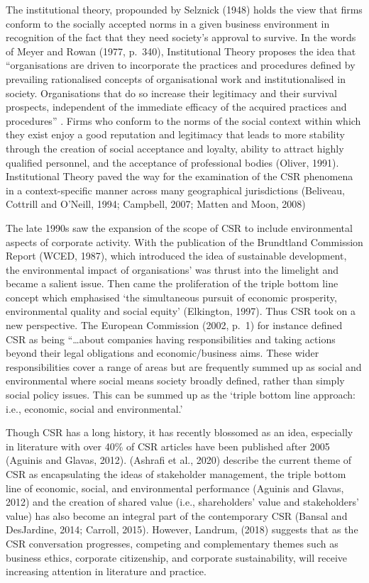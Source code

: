 \documentclass[
]{mitthesis}
\begin{document}
The institutional theory, propounded by Selznick (1948) holds the view that firms conform to the socially accepted norms in a given business environment in recognition of the fact that they need society's approval to survive. In the words of Meyer and Rowan (1977, p.~340), Institutional Theory proposes the idea that ``organisations are driven to incorporate the practices and procedures defined by prevailing rationalised concepts of organisational work and institutionalised in society. Organisations that do so increase their legitimacy and their survival prospects, independent of the immediate efficacy of the acquired practices and procedures'' . Firms who conform to the norms of the social context within which they exist enjoy a good reputation and legitimacy that leads to more stability through the creation of social acceptance and loyalty, ability to attract highly qualified personnel, and the acceptance of professional bodies (Oliver, 1991). Institutional Theory paved the way for the examination of the CSR phenomena in a context-specific manner across many geographical jurisdictions (Beliveau, Cottrill and O'Neill, 1994; Campbell, 2007; Matten and Moon, 2008)

The late 1990s saw the expansion of the scope of CSR to include environmental aspects of corporate activity. With the publication of the Brundtland Commission Report (WCED, 1987), which introduced the idea of sustainable development, the environmental impact of organisations' was thrust into the limelight and became a salient issue. Then came the proliferation of the triple bottom line concept which emphasised `the simultaneous pursuit of economic prosperity, environmental quality and social equity' (Elkington, 1997). Thus CSR took on a new perspective. The European Commission (2002, p.~1) for instance defined CSR as being
``\ldots about companies having responsibilities and taking actions beyond their legal obligations and economic/business aims. These wider responsibilities cover a range of areas but are frequently summed up as social and environmental where social means society broadly defined, rather than simply social policy issues. This can be summed up as the `triple bottom line approach: i.e., economic, social and environmental.'

Though CSR has a long history, it has recently blossomed as an idea, especially in literature with over 40\% of CSR articles have been published after 2005 (Aguinis and Glavas, 2012). (Ashrafi et al., 2020) describe the current theme of CSR as encapsulating the ideas of stakeholder management, the triple bottom line of economic, social, and environmental performance (Aguinis and Glavas, 2012) and the creation of shared value (i.e., shareholders' value and stakeholders' value) has also become an integral part of the contemporary CSR (Bansal and DesJardine, 2014; Carroll, 2015). However, Landrum, (2018) suggests that as the CSR conversation progresses, competing and complementary themes such as business ethics, corporate citizenship, and corporate sustainability, will receive increasing attention in literature and practice.
\end{document}
